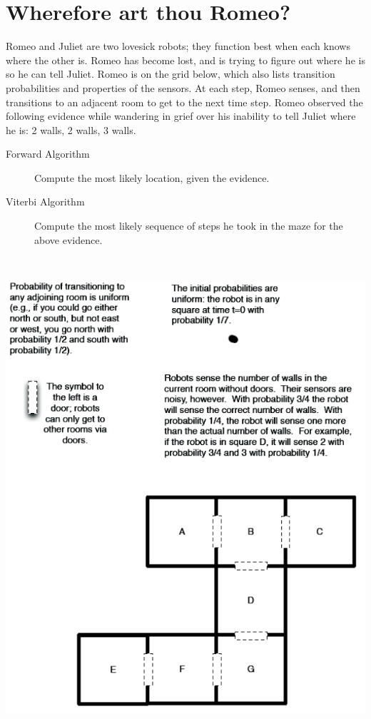 \documentclass[12pt]{article}
\begin{document}
\section{Wherefore art thou Romeo?}

Romeo and Juliet are two lovesick robots; they function best when each
knows where the other is.  Romeo has become lost, and is trying to
figure out where he is so he can tell Juliet.  Romeo is on the grid
below, which also lists transition probabilities and properties of the
sensors.  At each step, Romeo senses, and then transitions to an
adjacent room to get to the next time step.  Romeo observed the
following evidence while wandering in grief over his inability to tell
Juliet where he is: 2 walls, 2 walls, 3 walls.

\begin{description}

\item[Forward Algorithm] Compute the most likely location, given the evidence.

\item[Viterbi Algorithm] Compute the most likely sequence of steps he
  took in the maze for the above evidence.

\end{description}

\clearpage

\begin{center}
\includegraphics[height=7in]{prob2.png}
\end{center}
\end{document}

